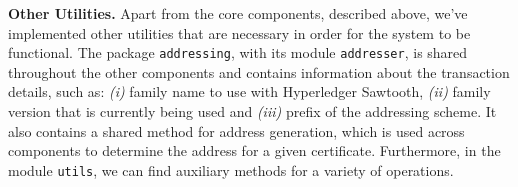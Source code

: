 \textbf{Other Utilities.} Apart from the core components, described above, we've implemented other utilities that are necessary in order for the system to be functional. The package \texttt{addressing}, with its module \texttt{addresser}, is shared throughout the other components and contains  information about the transaction details, such as: \emph{(i)} family name to use with Hyperledger Sawtooth, \emph{(ii)} family version that is currently being used and \emph{(iii)} prefix of the addressing scheme. It also contains a shared method for address generation, which is used across components to determine the address for a given certificate. Furthermore, in the module \texttt{utils}, we can find auxiliary methods for a variety of operations.
